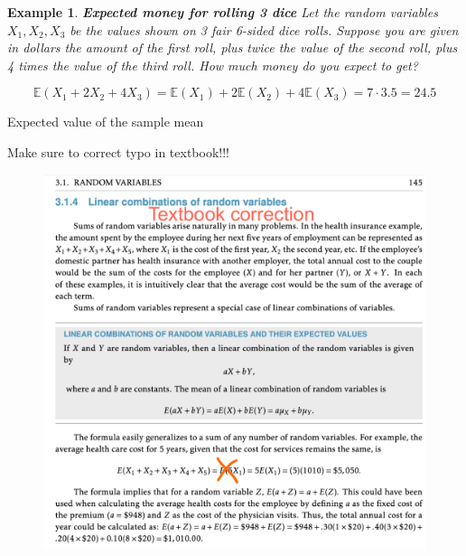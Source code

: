 \documentclass[12pt]{amsart}
\newtheorem{example}[theorem]{Example}
\begin{document}
{%
\begin{example}  \textbf{Expected money for rolling 3 dice} \newline
Let the random variables $X_1, X_2, X_3$ be the values shown on 3 fair 6-sided dice rolls. \newline 
Suppose you are given in dollars the amount of the first roll, plus twice the value of the second roll, plus 4 times the value of the third roll. \newline 
How much money do you expect to get?  \newline 


\color{blue}
$$\mathbb{E}(X_1 + 2X_2 + 4X_3) = \mathbb{E}(X_1) + 2\mathbb{E}(X_2) + 4\mathbb{E}(X_3) = 7\cdot 3.5 = 24.5$$
\color{black}

\end{example} 

\vspace{2cm}

\color{blue}
Expected value of the sample mean
\color{black}


\newpage

Make sure to correct typo in textbook!!!

\vspace{2cm}

\begin{figure}[h!]
  \includegraphics[width=7in]{img/VH_LinearCombo_E[5X]_error.pdf}
  \label{fig:BookError}
\end{figure}



}
\end{document}
